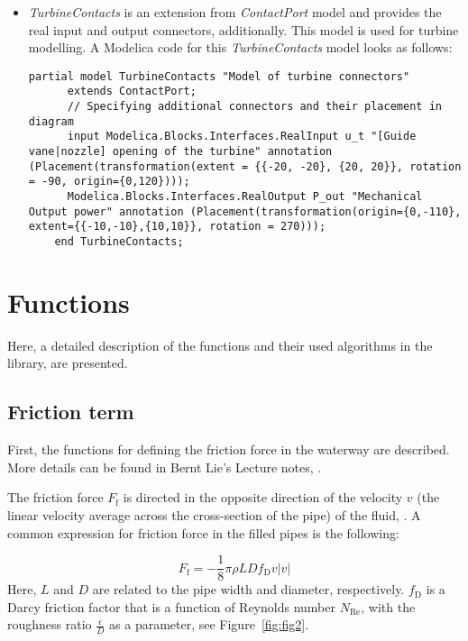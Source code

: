 \documentclass[%
]{USN-PhD}
\begin{document}
\begin{itemize}
    \item \emph{TurbineContacts} is an extension from \emph{ContactPort} model and provides the real input and output connectors, additionally. This model is used for turbine modelling. A Modelica code for this \emph{TurbineContacts} model looks as follows:
    \begin{lstlisting}[language = modelica]
    partial model TurbineContacts "Model of turbine connectors"
      extends ContactPort;
      // Specifying additional connectors and their placement in diagram
      input Modelica.Blocks.Interfaces.RealInput u_t "[Guide vane|nozzle] opening of the turbine" annotation (Placement(transformation(extent = {{-20, -20}, {20, 20}}, rotation = -90, origin={0,120})));
      Modelica.Blocks.Interfaces.RealOutput P_out "Mechanical Output power" annotation (Placement(transformation(origin={0,-110}, extent={{-10,-10},{10,10}}, rotation = 270)));
    end TurbineContacts;
    \end{lstlisting}
\end{itemize}

\section{Functions}

Here, a detailed description of the functions and their used algorithms in the library, are presented.

\subsection{Friction term}

First, the functions for defining the friction force in the waterway are described. More details can be found in Bernt Lie's Lecture notes, \cite{LieL:18}.

The friction force $F_\mathrm{f}$ is directed in the opposite direction of the velocity $v$ (the linear velocity average across the cross-section of the pipe) of the fluid, \cite{LieL:18}. A common expression for friction force in the filled pipes is the following:

\begin{equation}\label{eq:eq1}
    F_\mathrm{f}=-\frac{1}{8}\pi\rho LDf_\mathrm{D}v|v|
\end{equation}
Here, $L$ and $D$ are related to the pipe width and diameter, respectively. $f_\mathrm{D}$ is a Darcy friction factor that is a function of Reynolds number $N_\mathrm{Re}$, with the roughness ratio $\frac{\epsilon}{D}$ as a parameter, see Figure~\ref{fig:fig2}.
\end{document}

